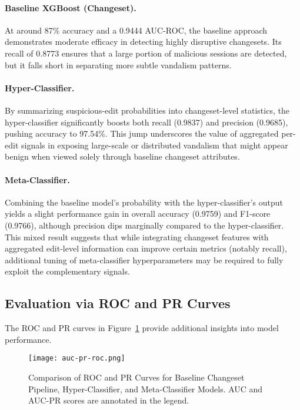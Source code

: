 \documentclass[
    13pt, %
    a4paper, %
    listof=totoc, %
    bibliography=totoc, %
    index=totoc, %
    headsepline
]{scrreprt}
\begin{document}
\paragraph{Baseline XGBoost (Changeset).}
At around 87\% accuracy and a 0.9444 AUC-ROC, the baseline approach demonstrates moderate efficacy in detecting highly disruptive changesets. Its recall of 0.8773 ensures that a large portion of malicious sessions are detected, but it falls short in separating more subtle vandalism patterns.

\paragraph{Hyper-Classifier.}
By summarizing suspicious-edit probabilities into changeset-level statistics, the hyper-classifier significantly boosts both recall (0.9837) and precision (0.9685), pushing accuracy to 97.54\%. This jump underscores the value of aggregated per-edit signals in exposing large-scale or distributed vandalism that might appear benign when viewed solely through baseline changeset attributes.

\paragraph{Meta-Classifier.}
Combining the baseline model’s probability with the hyper-classifier’s output yields a slight performance gain in overall accuracy (0.9759) and F1-score (0.9766), although precision dips marginally compared to the hyper-classifier. This mixed result suggests that while integrating changeset features with aggregated edit-level information can improve certain metrics (notably recall), additional tuning of meta-classifier hyperparameters may be required to fully exploit the complementary signals.

\subsection{Evaluation via ROC and PR Curves}

The ROC and PR curves in Figure~\ref{fig:auc_pr_roc} provide additional insights into model performance.

\begin{figure}[H]
    \centering
    \texttt{[image: auc-pr-roc.png]}
    \caption{Comparison of ROC and PR Curves for Baseline Changeset Pipeline, Hyper-Classifier, and Meta-Classifier Models. AUC and AUC-PR scores are annotated in the legend.}
    \label{fig:auc_pr_roc}
\end{figure}
\end{document}
